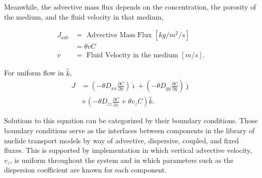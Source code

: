 Meanwhile, the advective mass flux depends on the concentration, the porosity 
of the medium, and the fluid velocity in that medium, 

    \begin{align}
      J_{adv} &= \mbox{ Advective Mass Flux }[kg/m^2/s]\nonumber\\
      &= \theta vC\nonumber\\
      v &= \mbox{ Fluid Velocity in the medium }[m/s].\nonumber
    \end{align}

For uniform flow in $\hat{k}$, 
    \begin{align}
      J &=\left(-\theta D_{xx} \frac{\partial C}{\partial x}
             \right)\hat{\imath}
             + \left( -\theta D_{yy} \frac{\partial C}{\partial y}
            \right)\hat{\jmath}\nonumber\\
            &+ \left( -\theta D_{zz} \frac{\partial C}{\partial z}
             + \theta v_zC \right)\hat{k}.
      \label{unidirflow}
    \end{align}

Solutions to this equation can be categorized by their boundary conditions.  
Those boundary conditions serve as the interfaces between components in the 
\Cyder library of nuclide transport models by way of advective, dispersive, 
coupled, and fixed fluxes.  This is supported by implementation in which 
vertical advective velocity, $v_z$, is uniform throughout the system and in which 
parameters such as the dispersion coefficient are known for each component. 




